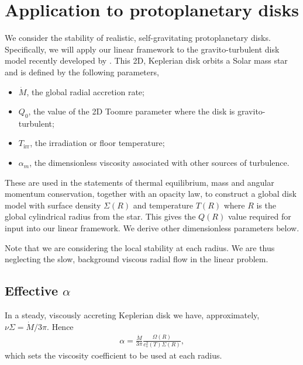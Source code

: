 \section{Application to protoplanetary disks}\label{2dppd}
We consider the stability of realistic, self-gravitating
protoplanetary disks. Specifically, we will apply our linear framework
to the gravito-turbulent disk model recently developed by 
\cite{rafikov15}. This 2D, Keplerian disk orbits a Solar mass star and 
is defined by the following parameters, 

\begin{itemize}
  \item $\dot{M}$, the global radial accretion rate;
  \item $Q_0$, the value of the 2D Toomre parameter where the disk is
    gravito-turbulent;
  \item $T_\mathrm{irr}$, the irradiation or floor temperature;
  \item $\alpha_m$, the dimensionless viscosity associated with other
    sources of turbulence.
\end{itemize} 
These are used in the statements of thermal equilibrium, mass and
angular momentum conservation, together with an opacity law, 
to construct a global disk model with surface density $\Sigma(R)$ and
temperature $T(R)$ where $R$ is the global cylindrical radius from the
star. This gives the $Q(R)$ value required for input
into our linear framework. We derive other dimensionless
parameters below. 

Note that we are considering the local stability at each radius. We
are thus neglecting the slow, background viscous radial flow in the
linear problem. 


\subsection{Effective $\alpha$}
In a steady, viscously accreting Keplerian disk we have,
approximately, $\nu\Sigma = \dot{M}/3\pi$. Hence
\begin{align}
  \alpha = \frac{\dot{M}}{3\pi}\frac{\Omega(R)}{c_{s}^2(T)\Sigma(R)},  
\end{align} 
which sets the viscosity coefficient to be used at each radius. 


